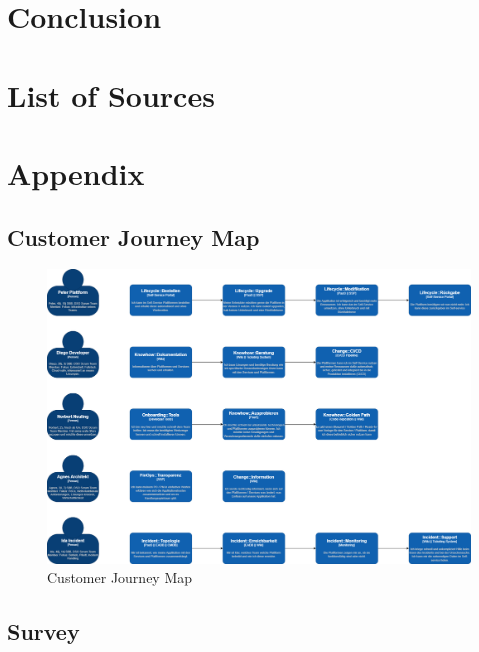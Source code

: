 \documentclass[a4paper,12pt]{article}
\begin{document}
    \section{Conclusion}
    \label{sec:conclusion}
    \pagebreak


    \section{List of Sources}
    \label{sec:bibliograhpy}
    \printbibliography[heading=none]


    \section{Appendix}
    \label{sec:appendix}

    \subsection{Customer Journey Map}
    \label{subsec:cusjourmap}
    \begin{figure}
        \includegraphics[angle=270,origin=c,width=\linewidth]{customer-journey.png}
        \caption{Customer Journey Map}
        \label{fig:customerjourney}
    \end{figure}

    \subsection{Survey}
    \label{subsec:survey}
\end{document}
